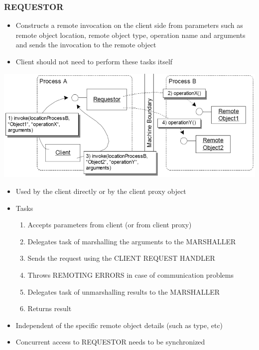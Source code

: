 \documentclass[10pt]{article}
\begin{document}
\subsubsection{REQUESTOR}
\begin{itemize}
	\item Constructs a remote invocation on the client side from parameters such as remote object location, remote object type, operation name and arguments and sends the invocation to the remote object
	\item Client should not need to perform these tasks itself
\end{itemize}
\begin{center}
	\includegraphics[scale=0.2]{requestor.png}
\end{center}
\begin{itemize}
	\item Used by the client directly or by the client proxy object
	\item Tasks
		\begin{enumerate}
			\item Accepts parameters from client (or from client proxy)
			\item Delegates task of marshalling the arguments to the MARSHALLER
			\item Sends the request using the CLIENT REQUEST HANDLER
			\item Throws REMOTING ERRORS in case of communication problems
			\item Delegates task of unmarshalling results to the MARSHALLER
			\item Returns result
		\end{enumerate}
	\item  Independent of the specific remote object details (such as type, etc)
	\item Concurrent access to REQUESTOR needs to be synchronized
\end{itemize}
\end{document}

